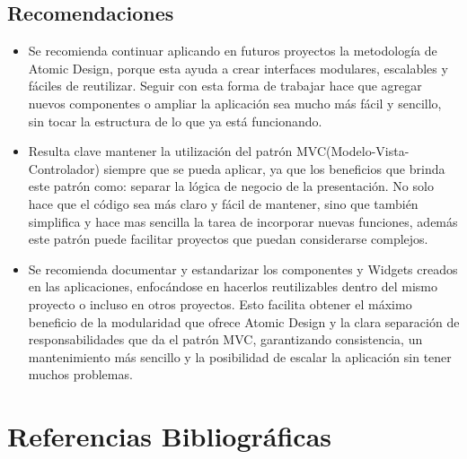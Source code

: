 \documentclass[12pt,letterpaper]{article}
\begin{document}
\subsection{Recomendaciones}

\begin{itemize}
    \item Se recomienda continuar aplicando en futuros proyectos la metodología de Atomic Design, porque esta ayuda a crear interfaces modulares, escalables y fáciles de reutilizar. Seguir con esta forma de trabajar hace que agregar nuevos componentes o ampliar la aplicación sea mucho más fácil y sencillo, sin tocar la estructura de lo que ya está funcionando.

    \item Resulta clave mantener la utilización del patrón MVC(Modelo-Vista-Controlador) siempre que se pueda aplicar, ya que los beneficios que brinda este patrón como: separar la lógica de negocio de la presentación. No solo hace que el código sea más claro y fácil de mantener, sino que también simplifica y hace mas sencilla la tarea de incorporar nuevas funciones, además este patrón puede facilitar proyectos que puedan considerarse complejos.
    
    \item Se recomienda documentar y estandarizar los componentes y Widgets creados en las aplicaciones, enfocándose en hacerlos reutilizables dentro del mismo proyecto o incluso en otros proyectos. Esto facilita obtener el máximo beneficio de  la modularidad que ofrece Atomic Design y la clara separación de responsabilidades que da el patrón MVC, garantizando consistencia, un mantenimiento más sencillo y la posibilidad de escalar la aplicación sin tener muchos problemas.
\end{itemize}



\section{Referencias Bibliográficas}
\printbibliography[heading=none]

\end{document}
